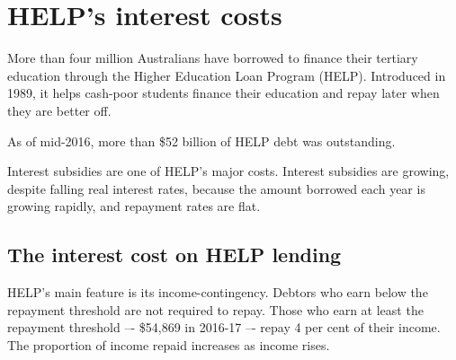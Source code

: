 \documentclass[embargoed]{grattan}
\begin{document}


\chapter[HELP's interest costs]{\gls{HELP}'s interest costs}\label{chap:2-helps-interest-costs}

More than four million Australians have borrowed to finance their tertiary education through the Higher Education Loan Program (\gls{HELP}).
Introduced in 1989, it helps cash-poor students finance their education and repay later when they are better off. 

As of mid-2016, more than \$52 billion of HELP debt was outstanding. 

Interest subsidies are one of \gls{HELP}'s major costs.
Interest subsidies are growing, despite falling real interest rates, because the amount borrowed each year is growing rapidly, and repayment rates are flat.

\section{The interest cost on \gls{HELP} lending}\label{sec:cpi-versus-the-governments-cost-of-borrowing}

\gls{HELP}’s main feature is its income-contingency.
Debtors who earn below the repayment threshold are not required to repay. 
Those who earn at least the repayment threshold –- \$54,869 in 2016-17 –- repay 4 per cent of their income. 
The proportion of income repaid increases as income rises. 
\end{document}
